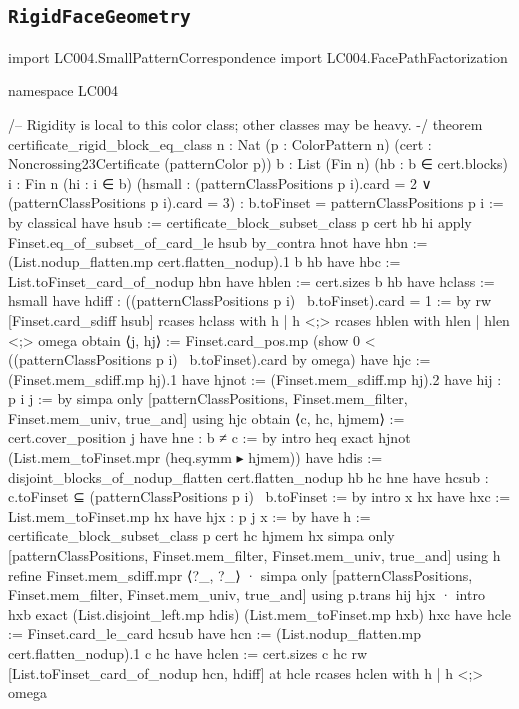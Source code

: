 \documentclass[11pt,reqno]{amsart}
\theoremstyle{definition}
\begin{document}
\subsection{\texorpdfstring{\texttt{RigidFaceGeometry}}{RigidFaceGeometry}}
\begin{LeanCode}
import LC004.SmallPatternCorrespondence
import LC004.FacePathFactorization

namespace LC004

/-- Rigidity is local to this color class; other classes may be heavy. -/
theorem certificate_rigid_block_eq_class {n : Nat} (p : ColorPattern n)
    (cert : Noncrossing23Certificate (patternColor p))
    {b : List (Fin n)} (hb : b ∈ cert.blocks) {i : Fin n} (hi : i ∈ b)
    (hsmall : (patternClassPositions p i).card = 2 ∨
      (patternClassPositions p i).card = 3) :
    b.toFinset = patternClassPositions p i := by
  classical
  have hsub := certificate_block_subset_class p cert hb hi
  apply Finset.eq_of_subset_of_card_le hsub
  by_contra hnot
  have hbn := (List.nodup_flatten.mp cert.flatten_nodup).1 b hb
  have hbc := List.toFinset_card_of_nodup hbn
  have hblen := cert.sizes b hb
  have hclass := hsmall
  have hdiff : ((patternClassPositions p i) \ b.toFinset).card = 1 := by
    rw [Finset.card_sdiff hsub]
    rcases hclass with h | h <;> rcases hblen with hlen | hlen <;> omega
  obtain ⟨j, hj⟩ := Finset.card_pos.mp (show 0 <
    ((patternClassPositions p i) \ b.toFinset).card by omega)
  have hjc := (Finset.mem_sdiff.mp hj).1
  have hjnot := (Finset.mem_sdiff.mp hj).2
  have hij : p i j := by
    simpa only [patternClassPositions, Finset.mem_filter, Finset.mem_univ, true_and] using hjc
  obtain ⟨c, hc, hjmem⟩ := cert.cover_position j
  have hne : b ≠ c := by
    intro heq
    exact hjnot (List.mem_toFinset.mpr (heq.symm ▸ hjmem))
  have hdis := disjoint_blocks_of_nodup_flatten cert.flatten_nodup hb hc hne
  have hcsub : c.toFinset ⊆ (patternClassPositions p i) \ b.toFinset := by
    intro x hx
    have hxc := List.mem_toFinset.mp hx
    have hjx : p j x := by
      have h := certificate_block_subset_class p cert hc hjmem hx
      simpa only [patternClassPositions, Finset.mem_filter, Finset.mem_univ, true_and] using h
    refine Finset.mem_sdiff.mpr ⟨?_, ?_⟩
    · simpa only [patternClassPositions, Finset.mem_filter,
        Finset.mem_univ, true_and] using p.trans hij hjx
    · intro hxb
      exact (List.disjoint_left.mp hdis) (List.mem_toFinset.mp hxb) hxc
  have hcle := Finset.card_le_card hcsub
  have hcn := (List.nodup_flatten.mp cert.flatten_nodup).1 c hc
  have hclen := cert.sizes c hc
  rw [List.toFinset_card_of_nodup hcn, hdiff] at hcle
  rcases hclen with h | h <;> omega


\end{LeanCode}
\end{document}
